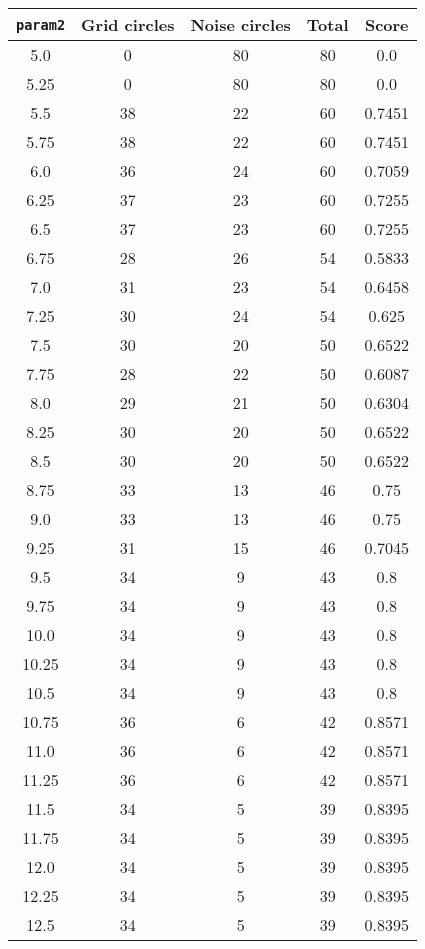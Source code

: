 \documentclass[letterpaper, 12pt]{article}
\begin{document}
\begin{longtable}{|c|c|c|c|c|}
\hline
\textbf{\texttt{param2}} & \textbf{Grid circles} & \textbf{Noise circles} & \textbf{Total} & \textbf{Score} \\
\hline
5.0 & 0 & 80 & 80 & 0.0 \\
\hline
5.25 & 0 & 80 & 80 & 0.0 \\
\hline
5.5 & 38 & 22 & 60 & 0.7451 \\
\hline
5.75 & 38 & 22 & 60 & 0.7451 \\
\hline
6.0 & 36 & 24 & 60 & 0.7059 \\
\hline
6.25 & 37 & 23 & 60 & 0.7255 \\
\hline
6.5 & 37 & 23 & 60 & 0.7255 \\
\hline
6.75 & 28 & 26 & 54 & 0.5833 \\
\hline
7.0 & 31 & 23 & 54 & 0.6458 \\
\hline
7.25 & 30 & 24 & 54 & 0.625 \\
\hline
7.5 & 30 & 20 & 50 & 0.6522 \\
\hline
7.75 & 28 & 22 & 50 & 0.6087 \\
\hline
8.0 & 29 & 21 & 50 & 0.6304 \\
\hline
8.25 & 30 & 20 & 50 & 0.6522 \\
\hline
8.5 & 30 & 20 & 50 & 0.6522 \\
\hline
8.75 & 33 & 13 & 46 & 0.75 \\
\hline
9.0 & 33 & 13 & 46 & 0.75 \\
\hline
9.25 & 31 & 15 & 46 & 0.7045 \\
\hline
9.5 & 34 & 9 & 43 & 0.8 \\
\hline
9.75 & 34 & 9 & 43 & 0.8 \\
\hline
10.0 & 34 & 9 & 43 & 0.8 \\
\hline
10.25 & 34 & 9 & 43 & 0.8 \\
\hline
10.5 & 34 & 9 & 43 & 0.8 \\
\hline
10.75 & 36 & 6 & 42 & 0.8571 \\
\hline
11.0 & 36 & 6 & 42 & 0.8571 \\
\hline
11.25 & 36 & 6 & 42 & 0.8571 \\
\hline
11.5 & 34 & 5 & 39 & 0.8395 \\
\hline
11.75 & 34 & 5 & 39 & 0.8395 \\
\hline
12.0 & 34 & 5 & 39 & 0.8395 \\
\hline
12.25 & 34 & 5 & 39 & 0.8395 \\
\hline
12.5 & 34 & 5 & 39 & 0.8395 \\

\end{longtable}
\end{document}
